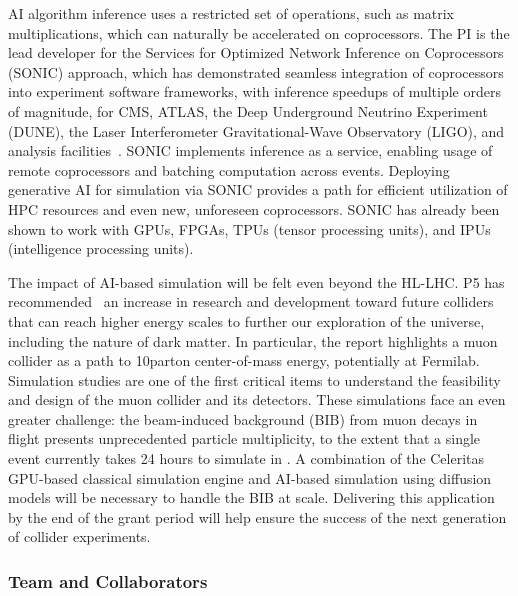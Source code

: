 AI algorithm inference uses a restricted set of operations, such as matrix multiplications, which can naturally be accelerated on coprocessors.
The PI is the lead developer for the Services for Optimized Network Inference on Coprocessors (SONIC) approach,
which has demonstrated seamless integration of coprocessors into experiment software frameworks, with inference speedups of multiple orders of magnitude,
for CMS, ATLAS, the Deep Underground Neutrino Experiment (DUNE), the Laser Interferometer Gravitational-Wave Observatory (LIGO), and analysis facilities~\cite{Duarte:2019fta,Krupa:2020bwg,Wang:2020fjr,Rankin:2020usv,Gunny:2021gne,Cai:2023ldc,CMS:2023not,Savard:2023wwi}.
SONIC implements inference as a service, enabling usage of remote coprocessors and batching computation across events.
Deploying generative AI for simulation via SONIC provides a path for efficient utilization of HPC resources and even new, unforeseen coprocessors.
SONIC has already been shown to work with GPUs, FPGAs, TPUs (tensor processing units), and IPUs (intelligence processing units).

The impact of AI-based simulation will be felt even beyond the HL-LHC.
P5 has recommended~\cite{P5:2023} an increase in research and development toward future colliders that can reach higher energy scales
to further our exploration of the universe, including the nature of dark matter.
In particular, the report highlights a muon collider as a path to 10\TeV parton center-of-mass energy, potentially at Fermilab.
Simulation studies are one of the first critical items to understand the feasibility and design of the muon collider and its detectors.
These simulations face an even greater challenge: the beam-induced background (BIB) from muon decays in flight presents unprecedented particle multiplicity,
to the extent that a single event currently takes 24 hours to simulate in \GEANTfour.
A combination of the Celeritas GPU-based classical simulation engine and AI-based simulation using diffusion models will be necessary to handle the BIB at scale.
Delivering this application by the end of the grant period will help ensure the success of the next generation of collider experiments.

\subsubsection{Team and Collaborators}\label{subsec:simteam}

